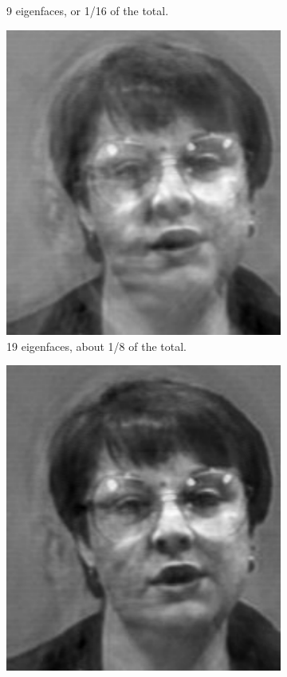 \begin{figure}
\begin{subfigure}[b]{0.3\textwidth}
    \caption{9 eigenfaces, or 1/16 of the total.}
    \label{fig:9_efaces}
\end{subfigure}
\begin{subfigure}[b]{0.3\textwidth}
    \includegraphics[width=\textwidth]{figures/rebuiltEighth.pdf}
    \caption{19 eigenfaces, about 1/8 of the total.}
    \label{fig:19_efaces}
\end{subfigure}
\begin{subfigure}[b]{0.3\textwidth}
    \includegraphics[width=\textwidth]{figures/rebuiltFourth.pdf}

\end{subfigure}
\end{figure}
